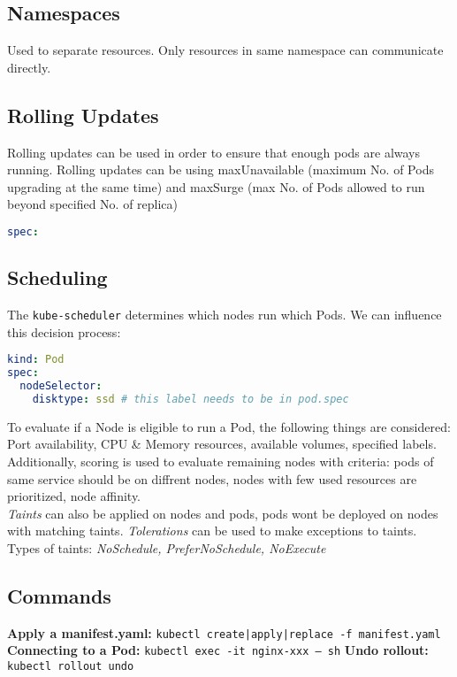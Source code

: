 \subsection{Namespaces}
Used to separate resources. Only resources in same namespace can communicate directly.


\subsection{Rolling Updates}
Rolling updates can be used in order to ensure that enough pods are always running.
Rolling updates can be using maxUnavailable (maximum No. of Pods upgrading at the same time) and maxSurge (max No. of Pods allowed to run beyond specified No. of replica)

\begin{lstlisting}[language=yaml]
spec:
\end{lstlisting}

\subsection{Scheduling}
The \texttt{kube-scheduler} determines which nodes run which Pods. We can influence this decision process:

\begin{lstlisting}[language=yaml]
kind: Pod
spec:
  nodeSelector:
    disktype: ssd # this label needs to be in pod.spec
\end{lstlisting}

To evaluate if a Node is eligible to run a Pod, the following things are considered: Port availability, CPU \& Memory resources, available volumes, specified labels. Additionally, scoring is used to evaluate remaining nodes with criteria: pods of same service should be on diffrent nodes, nodes with few used resources are prioritized, node affinity. \\
\textit{Taints} can also be applied on nodes and pods, pods wont be deployed on nodes with matching taints. \textit{Tolerations} can be used to make exceptions to taints. Types of taints: \textit{NoSchedule, PreferNoSchedule, NoExecute}


\subsection{Commands}
\textbf{Apply a manifest.yaml:} \texttt{kubectl {create|apply|replace} -f manifest.yaml} \\
\textbf{Connecting to a Pod:} \texttt{kubectl exec -it nginx-xxx -- sh}
\textbf{Undo rollout:} \texttt{kubectl rollout undo}
